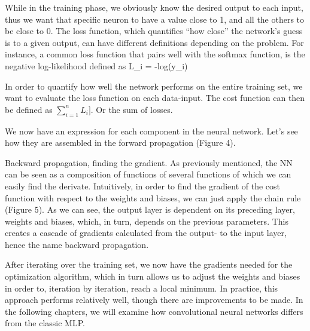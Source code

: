 While in the training phase, we obviously know the desired output to each input, thus we want that specific neuron to have a value close to 1, and all the others to be close to 0. 
The loss function, which quantifies “how close” the network’s guess is to a given output, can have different definitions depending on the problem.
For instance, a common loss function that pairs well with the softmax function, is the negative log-likelihood defined as
\startformula
L_i = -log(y_i)
\stopformula 

In order to quantify how well the network performs on the entire training set, we want to evaluate the loss function on each data-input. 
The cost function can then be defined as $\sum_{i=1}^n L_i]$. Or the sum of losses. 
\stopsubsection

\startsubsection[title=Forward propagation]
We now have an expression for each component in the neural network.
Let’s see how they are assembled in the forward propagation (Figure 4).
\stopsubsection
 
\startsubsection[title=Backward propogation]
Backward propagation, finding the gradient. 
As previously mentioned, the NN can be seen as a composition of functions of several functions of which we can easily find the derivate.
Intuitively, in order to find the gradient of the cost function with respect to the weights and biases, we can just apply the chain rule (Figure 5).
As we can see, the output layer is dependent on its preceding layer, weights and biases, which, in turn, depends on the previous parameters.
This creates a cascade of gradients calculated from the output- to the input layer, hence the name backward propagation.  

After iterating over the training set, we now have the gradients needed for the optimization algorithm, which in turn allows us to adjust the weights and biases in order to, iteration by iteration, reach a local minimum.
In practice, this approach performs relatively well, though there are improvements to be made.
In the following chapters, we will examine how convolutional neural networks differs from the classic MLP. 
\stopsubsection
\stopsection